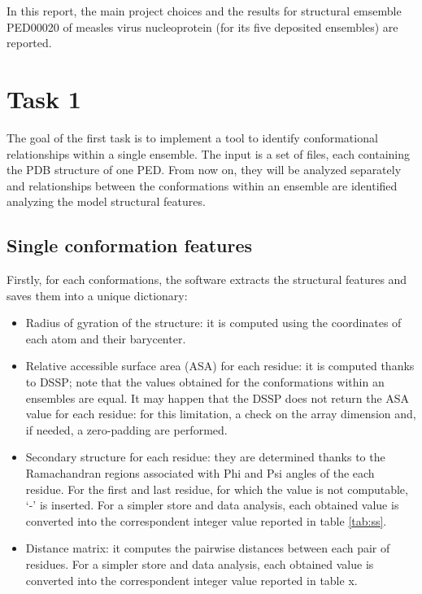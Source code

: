 In this report, the main project choices and the results for structural emsemble PED00020 of measles virus nucleoprotein (for its five deposited ensembles) are reported.

\section{Task 1}\label{sec:task1}
\graphicspath{ {./figures/} }

The goal of the first task is to implement a tool to identify conformational relationships within a single ensemble. The input is a set of files, each containing the PDB structure of one PED. From now on, they will be analyzed separately and relationships between the conformations within an ensemble are identified analyzing the model structural features. 


\subsection{Single conformation features}

Firstly, for each conformations, the software extracts the structural features and saves them into a unique dictionary:
\begin{itemize}
\item Radius of gyration of the structure: it is computed using the coordinates of each atom and their barycenter.
\item Relative accessible surface area (ASA) for each residue: it is computed thanks to DSSP; note that the values obtained for the conformations within an ensembles are equal. It may happen that the DSSP does not return the ASA value for each residue: for this limitation, a check on the array dimension and, if needed, a zero-padding are performed. 
\item Secondary structure for each residue: they are determined thanks to the Ramachandran regions associated with Phi and Psi angles of the each residue. For the first and last residue, for which the value is not computable, `-' is inserted. For a simpler store and data analysis, each obtained value is converted into the correspondent integer value reported in table \ref{tab:ss}. 
\item Distance matrix: it computes the pairwise distances between each pair of residues. For a simpler store and data analysis, each obtained value is converted into the correspondent integer value reported in table x.
\end{itemize}

